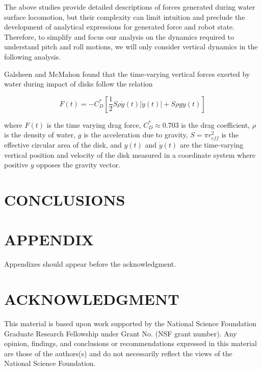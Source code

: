 \documentclass[letterpaper, 10 pt, conference]{ieeeconf}  %
\begin{document}
The above studies provide detailed descriptions of forces generated during water surface locomotion, but their complexity can limit intuition and preclude the development of analytical expressions for generated force and robot state.  Therefore, to simplify and focus our analysis on the dynamics required to understand pitch and roll motions, we will only consider vertical dynamics in the following analysis. 


Galsheen and McMahon \cite{glasheen1996vertical} found that the time-varying vertical forces exerted by water during impact of disks follow the relation

\begin{equation}
	F(t) = - C_D^* \left[\frac{1}{2} S \rho \dot{y}(t) |\dot{y}(t) | + S \rho g y(t) \right]
\end{equation}

\noindent where $F(t)$ is the time varying drag force, $C_D^* \approx 0.703$ is the drag coefficient, $\rho$ is the density of water, $g$ is the acceleration due to gravity, $S = \pi r_{eff}^2$ is the effective circular area of the disk, and $y(t)$ and $\dot{y}(t)$ are the time-varying vertical position and velocity of the disk measured in a coordinate system where positive $y$ opposes the gravity vector. 

\section{CONCLUSIONS}



\section*{APPENDIX}

Appendixes should appear before the acknowledgment.

\section*{ACKNOWLEDGMENT}

This material is based upon work supported by the National Science Foundation Graduate Research Fellowship under Grant No. (NSF grant number). Any opinion, findings, and conclusions or recommendations expressed in this material are those of the authors(s) and do not necessarily reflect the views of the National Science Foundation.



\end{document}
